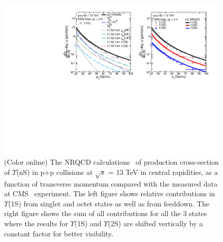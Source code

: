 \begin{figure}
  \centering
  \includegraphics[width=0.99\textwidth]{Figures/Fig3_CMS_YnS_Rap12_13TeV_Pt.pdf}
  \caption{\small{(Color online) The NRQCD calculations~\cite{Kumar:2021sek} of production cross-section of $\Upsilon$(nS)
      in p+p collisions at $\sqrt{s}$ = 13 TeV in central rapidities, as a function of
      transverse momentum compared with the measured data at CMS~\cite{CMS:2017dju}
      experiment. The left figure shows relative contributions in $\Upsilon$(1S) from
      singlet and octet states as well as from feeddown. The right figure shows the sum
      of all contributions for all the 3 states where the results for $\Upsilon$(1S) and
      $\Upsilon$(2S) are shifted vertically by a constant factor for better visibility. } }
  \label{Fig:SigmaYnSCMS13TeV}
\end{figure}



